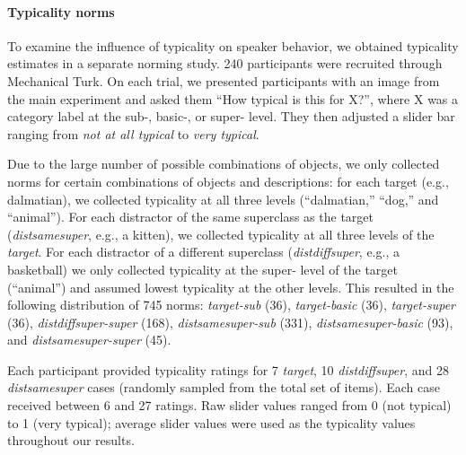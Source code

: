 \documentclass[10pt,letterpaper]{article}
\newcommand{\caroline}[1]{\textcolor{Red}{#1}}
\begin{document}

\paragraph{Typicality norms}

To examine the influence of typicality on speaker behavior, we obtained typicality estimates in a separate norming study. 240 participants were recruited through Mechanical Turk. On each trial, we presented participants with an image from the main experiment and asked them ``How typical is this for X?'', where X was a category label at the sub-, basic-, or super- level. They then adjusted a slider bar ranging from \emph{not at all typical} to \emph{very typical}. 

Due to the large number of possible combinations of objects, we only collected norms for certain combinations of objects and descriptions: for each target (e.g., dalmatian), we collected typicality at all three levels (``dalmatian,'' ``dog,'' and ``animal''). For each distractor of the same superclass as the target (\emph{distsamesuper}, e.g., a kitten), we collected typicality at all three levels of the \emph{target}. For each distractor of a different superclass (\emph{distdiffsuper}, e.g., a basketball) we only collected typicality at the super- level of the target (``animal'') and assumed lowest typicality at the other levels. This resulted in the following distribution of 745 norms:  \emph{target-sub} (36), \emph{target-basic} (36), \emph{target-super} (36), \emph{distdiffsuper-super} (168), \emph{distsamesuper-sub} (331), \emph{distsamesuper-basic} (93), and \emph{distsamesuper-super} (45). 

Each participant provided typicality ratings for 7 \emph{target}, 10 \emph{distdiffsuper}, and 28 \emph{distsamesuper} cases (randomly sampled from the total set of items). Each case received between 6 and 27 ratings.  Raw slider values ranged from 0 (not typical) to 1 (very typical); average slider values were used as the typicality values throughout our results. 
\end{document}

